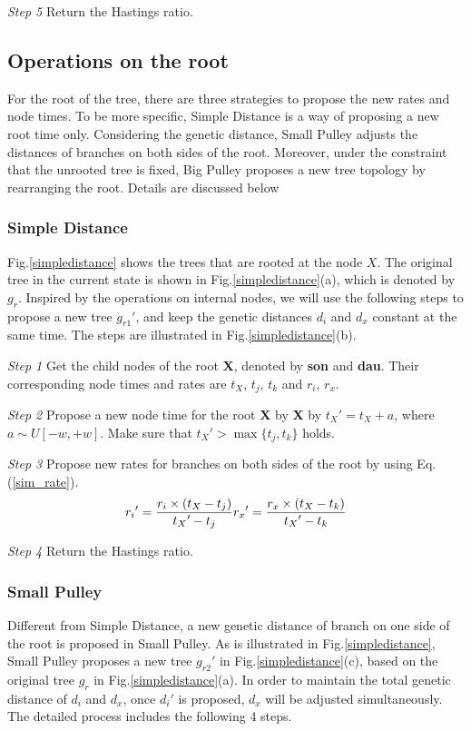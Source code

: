 \documentclass{bmcart}
\begin{document}
\emph{Step 5} Return the Hastings ratio.
\subsection*{Operations on the root}
For the root of the tree, there are three strategies to propose the new rates and node times. To be more specific, Simple Distance is a way of proposing a new root time only. Considering the genetic distance, Small Pulley adjusts the distances of branches on both sides of the root. Moreover, under the constraint that the unrooted tree is fixed, Big Pulley proposes a new tree topology by rearranging the root.  Details are discussed below
\subsubsection*{Simple Distance}
Fig.\ref{simpledistance} shows the trees that are rooted at the node $X$. The original tree in the current state is shown in Fig.\ref{simpledistance}(a), which is denoted by $g_r$. Inspired by the operations on internal nodes, we will use the following steps to propose a new tree ${g_{r1}}'$, and keep the genetic distances $d_i$ and $d_x$ constant at the same time. The steps are illustrated in Fig.\ref{simpledistance}(b).

\emph{Step 1} Get the child nodes of the root \textbf{X}, denoted by \textbf{son} and \textbf{dau}. Their corresponding node times and rates are $t_X$, $t_j$, $t_k$ and $r_i$, $r_x$.

\emph{Step 2} Propose a new node time for the root \textbf{X} by \textbf{X} by ${t_X}' = {t_X} + a$, where $a \sim U[ - w, + w]$. Make sure that ${t_X}' > \max \{ {t_j},{t_k}\} $ holds.

\emph{Step 3} Propose new rates for branches on both sides of the root by using Eq.(\ref{sim_rate}).
\begin{equation}
\label{sim_rate}
{r_i}' = \frac{{{r_i} \times ({{t_X} - {t_j}})}}{{{t_X}' - {t_j}}}\\
{r_x}' = \frac{{{r_x} \times ({{t_X} - {t_k}})}}{{{t_X}' - {t_k}}}
 \end{equation}

\emph{Step 4} Return the Hastings ratio.
\subsubsection*{Small Pulley}
Different from Simple Distance, a new genetic distance of branch on one side of the root is proposed in Small Pulley. As is illustrated in Fig.\ref{simpledistance}, Small Pulley proposes a new tree ${g_{r2}}'$ in Fig.\ref{simpledistance}(c), based on the original tree $g_r$ in Fig.\ref{simpledistance}(a). In order to maintain the total genetic distance of $d_i$ and $d_x$, once ${d_i}'$ is proposed, $d_x$ will be adjusted simultaneously. The detailed process includes the following 4 steps.
\end{document}
